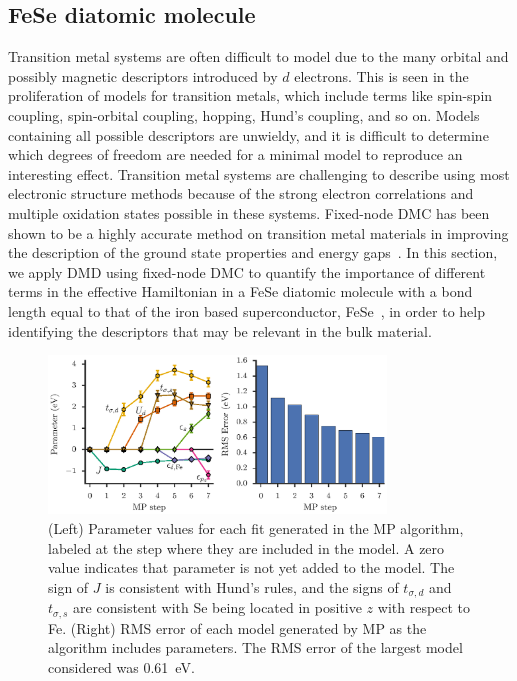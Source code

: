 \subsection{FeSe diatomic molecule}
\label{subsection:fese}
Transition metal systems are often difficult to model due to the many orbital and possibly magnetic descriptors introduced by $d$ electrons. 
This is seen in the proliferation of models for transition metals, which include terms like spin-spin coupling, spin-orbital coupling, hopping, Hund's coupling, and so on. 
Models containing all possible descriptors are unwieldy, and it is difficult to determine which degrees of freedom are needed for a minimal model to reproduce an interesting effect. 
Transition metal systems are challenging to describe using most electronic structure methods because of the strong electron correlations and multiple oxidation states possible in these systems. 
Fixed-node DMC has been shown to be a highly accurate method on transition metal materials in improving the description of the ground state properties and energy gaps~\cite{Foyevtsova2014, Wagner_Abbamonte, Zheng2015, Wagner2016}. In this section, we apply DMD using fixed-node DMC to quantify the importance of different terms in the effective Hamiltonian in a FeSe diatomic molecule with a bond length equal to that of the iron based superconductor, FeSe~\cite{kumar_crystal_2010}, in order to help identifying the descriptors that may be relevant in the bulk material.
\begin{figure}[htb]
  \centering
  \includegraphics[width=0.8\textwidth]{./Figures/fese.eps}
  \caption{
    \label{fig:fese} 
    (Left) Parameter values for each fit generated in the MP algorithm, labeled at the step where they are included in the model. 
    A zero value indicates that parameter is not yet added to the model.
    The sign of $J$ is consistent with Hund's rules, and the signs of $t_{\sigma,d}$ and $t_{\sigma,s}$ are consistent with Se being located in positive $z$ with respect to Fe. 
    (Right) RMS error of each model generated by MP as the algorithm includes parameters. 
    The RMS error of the largest model considered was 0.61~eV.
  }
\end{figure}
